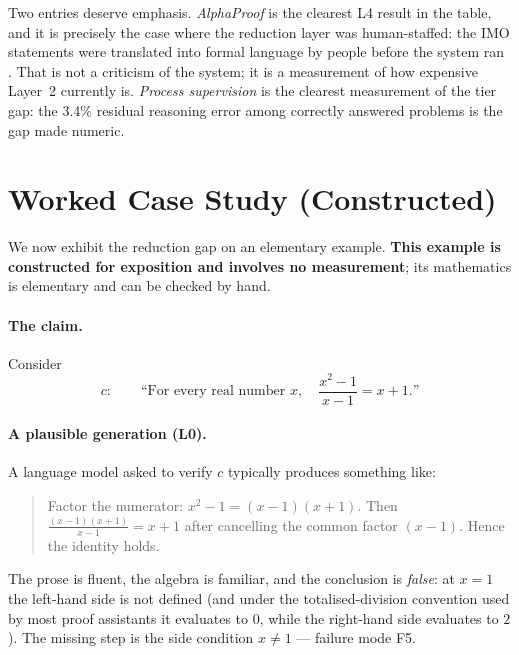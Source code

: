 \documentclass[11pt,a4paper]{article}
\theoremstyle{plain}
\theoremstyle{remark}
\begin{document}
Two entries deserve emphasis.  \emph{AlphaProof} is the clearest L4 result in
the table, and it is precisely the case where the reduction layer was
human-staffed: the IMO statements were translated into formal language by
people before the system ran \cite{hubert2025alphaproof}.  That is not a
criticism of the system; it is a measurement of how expensive Layer~2 currently
is.  \emph{Process supervision} is the clearest measurement of the tier gap:
the 3.4\% residual reasoning error among correctly answered problems
\cite{uesato2022process} is the gap made numeric.

\section{Worked Case Study (Constructed)}
\label{sec:case}

We now exhibit the reduction gap on an elementary example.  \textbf{This
example is constructed for exposition and involves no measurement}; its
mathematics is elementary and can be checked by hand.

\paragraph{The claim.}  Consider
\[
  c:\qquad \text{``For every real number } x,\quad \frac{x^{2}-1}{x-1}=x+1.\text{''}
\]

\paragraph{A plausible generation (L0).}  A language model asked to verify $c$
typically produces something like:
\begin{quote}\small
  Factor the numerator: $x^{2}-1=(x-1)(x+1)$.  Then
  $\frac{(x-1)(x+1)}{x-1}=x+1$ after cancelling the common factor $(x-1)$.
  Hence the identity holds.
\end{quote}
The prose is fluent, the algebra is familiar, and the conclusion is
\emph{false}: at $x=1$ the left-hand side is not defined (and under the
totalised-division convention used by most proof assistants it evaluates to
$0$, while the right-hand side evaluates to $2$).  The missing step is the side
condition $x\neq 1$ --- failure mode F5.
\end{document}

